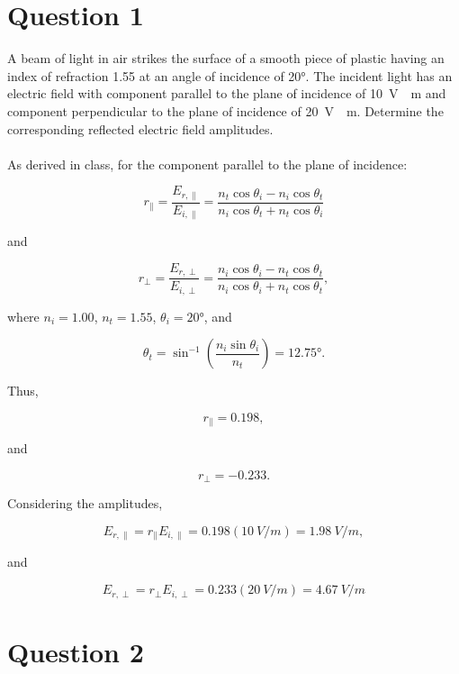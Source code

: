 \documentclass[a4paper]{article}
\begin{document}
\section*{Question 1}
A beam of light in air strikes the surface of a smooth piece of plastic having an index of refraction 1.55 at an angle of incidence of \ang{20}. The incident light has an electric field with component parallel to the plane of incidence of \qty{10}{V \per m} and component perpendicular to the plane of incidence of \qty{20}{V \per m}. Determine the corresponding reflected electric field amplitudes. \\\\

As derived in class, for the component parallel to the plane of incidence:

\[
    r_\parallel = \frac{E_{r, \parallel}}{E_{i, \parallel}} = \frac{n_t \cos \theta_i - n_i \cos \theta_t}{n_i \cos \theta_t + n_t \cos \theta_i}
\]

and 

\[
    r_\perp = \frac{E_{r, \perp}}{E_{i, \perp}} = \frac{n_i \cos \theta_i - n_t \cos \theta_t}{n_i \cos \theta_i + n_t \cos \theta_t},
\]

where $n_i = 1.00$, $n_t = 1.55$, $\theta_i = \ang{20}$, and 

\[
    \theta_t = \sin^{-1}\left(\frac{n_i \sin \theta_i}{n_t}\right) = \ang{12.75}.
\]

Thus,

\[
    r_\parallel = 0.198,
\]

and

\[
    r_\perp = -0.233.
\]

Considering the amplitudes,

\[
    E_{r, \parallel} = r_\parallel E_{i, \parallel} = 0.198 (\qty{10}{V \per m}) = \qty{1.98}{V \per m},
\]

and

\[
    E_{r, \perp} = r_\perp E_{i, \perp} = 0.233 (\qty{20}{V \per m}) = \qty{4.67}{V \per m}
\]
\newpage
\section*{Question 2}
\end{document}
